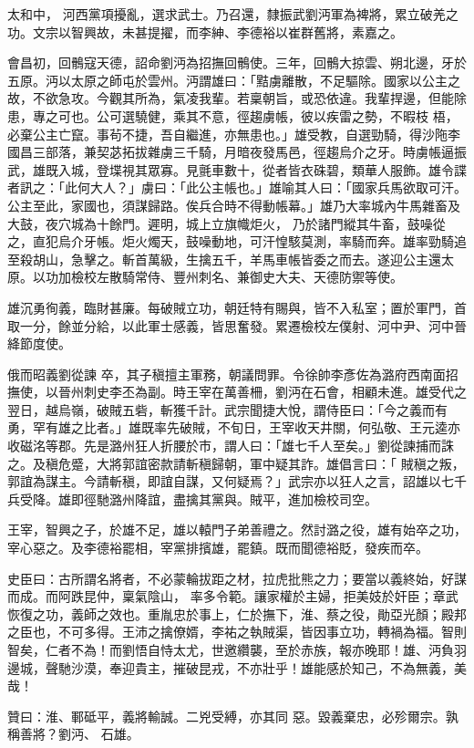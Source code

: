 \begin{pinyinscope}
 太和中，
 河西黨項擾亂，選求武士。乃召還，隸振武劉沔軍為裨將，累立破羌之功。文宗以智興故，未甚提擢，而李紳、李德裕以崔群舊將，素嘉之。



 會昌初，回鶻寇天德，詔命劉沔為招撫回鶻使。三年，回鶻大掠雲、朔北邊，牙於五原。沔以太原之師屯於雲州。沔謂雄曰：「黠虜離散，不足驅除。國家以公主之故，不欲急攻。今觀其所為，氣凌我輩。若稟朝旨，或恐依違。我輩捍邊，但能除患，專之可也。公可選驍健，乘其不意，徑趨虜帳，彼以疾雷之勢，不暇枝
 梧，必棄公主亡竄。事茍不捷，吾自繼進，亦無患也。」雄受教，自選勁騎，得沙陁李國昌三部落，兼契苾拓拔雜虜三千騎，月暗夜發馬邑，徑趨烏介之牙。時虜帳逼振武，雄既入城，登堞視其眾寡。見氈車數十，從者皆衣硃碧，類華人服飾。雄令諜者訊之：「此何大人？」虜曰：「此公主帳也。」雄喻其人曰：「國家兵馬欲取可汗。公主至此，家國也，須謀歸路。俟兵合時不得動帳幕。」雄乃大率城內牛馬雜畜及大鼓，夜穴城為十餘門。遲明，城上立旗幟炬火，
 乃於諸門縱其牛畜，鼓噪從之，直犯烏介牙帳。炬火燭天，鼓噪動地，可汗惶駭莫測，率騎而奔。雄率勁騎追至殺胡山，急擊之。斬首萬級，生擒五千，羊馬車帳皆委之而去。遂迎公主還太原。以功加檢校左散騎常侍、豐州刺名、兼御史大夫、天德防禦等使。



 雄沉勇徇義，臨財甚廉。每破賊立功，朝廷特有賜與，皆不入私室；置於軍門，首取一分，餘並分給，以此軍士感義，皆思奮發。累遷檢校左僕射、河中尹、河中晉絳節度使。



 俄而昭義劉從諫
 卒，其子稹擅主軍務，朝議問罪。令徐帥李彥佐為潞府西南面招撫使，以晉州刺史李丕為副。時王宰在萬善柵，劉沔在石會，相顧未進。雄受代之翌日，越烏嶺，破賊五砦，斬獲千計。武宗聞捷大悅，謂侍臣曰：「今之義而有勇，罕有雄之比者。」雄既率先破賊，不旬日，王宰收天井關，何弘敬、王元逵亦收磁洺等郡。先是潞州狂人折腰於市，謂人曰：「雄七千人至矣。」劉從諫捕而誅之。及稹危蹙，大將郭誼密款請斬稹歸朝，軍中疑其詐。雄倡言曰：「
 賊稹之叛，郭誼為謀主。今請斬稹，即誼自謀，又何疑焉？」武宗亦以狂人之言，詔雄以七千兵受降。雄即徑馳潞州降誼，盡擒其黨與。賊平，進加檢校司空。



 王宰，智興之子，於雄不足，雄以轅門子弟善禮之。然討潞之役，雄有始卒之功，宰心惡之。及李德裕罷相，宰黨排擯雄，罷鎮。既而聞德裕貶，發疾而卒。



 史臣曰：古所謂名將者，不必蒙輪拔距之材，拉虎批熊之力；要當以義終始，好謀而成。而阿跌昆仲，稟氣陰山，
 率多令範。讓家權於主婦，拒美妓於奸臣；章武恢復之功，義師之效也。重胤忠於事上，仁於撫下，淮、蔡之役，勛亞光顏；殿邦之臣也，不可多得。王沛之擒僚婿，李祐之執賊渠，皆因事立功，轉禍為福。智則智矣，仁者不為！而劉悟自恃太尤，世邀纘襲，至於赤族，報亦晚耶！雄、沔負羽邊城，聲馳沙漠，奉迎貴主，摧破昆戎，不亦壯乎！雄能感於知己，不為無義，美哉！



 贊曰：淮、鄆砥平，義將輸誠。二兇受縛，亦其同
 惡。毀義棄忠，必殄爾宗。孰稱善將？劉沔、
 石雄。



\end{pinyinscope}